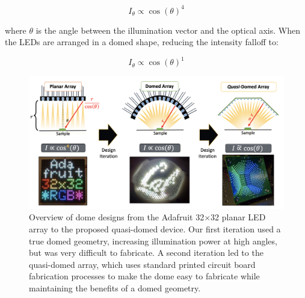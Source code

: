 \begin{equation}
    I_{\theta} \propto {\cos(\theta)}^4
\end{equation}

\noindent where $\theta$ is the angle between the illumination vector and the optical axis. When the LEDs are arranged in a domed shape, reducing the intensity falloff to:

\begin{equation}
I_{\theta} \propto {\cos(\theta)}^1
\end{equation}

\begin{figure} [ht]
\begin{center}
\includegraphics[width=\textwidth]{figures/fig_dome_overview.png}
\end{center}
\caption {Overview of dome designs from the Adafruit 32$\times$32 planar LED array to the proposed quasi-domed device. Our first iteration used a true domed geometry, increasing illumination power at high angles, but was very difficult to fabricate. A second iteration led to the quasi-domed array, which uses standard printed circuit board fabrication processes to make the dome easy to fabricate while maintaining the benefits of a domed geometry.}
\label{fig:fabrication:dome_overview}
\end{figure}

